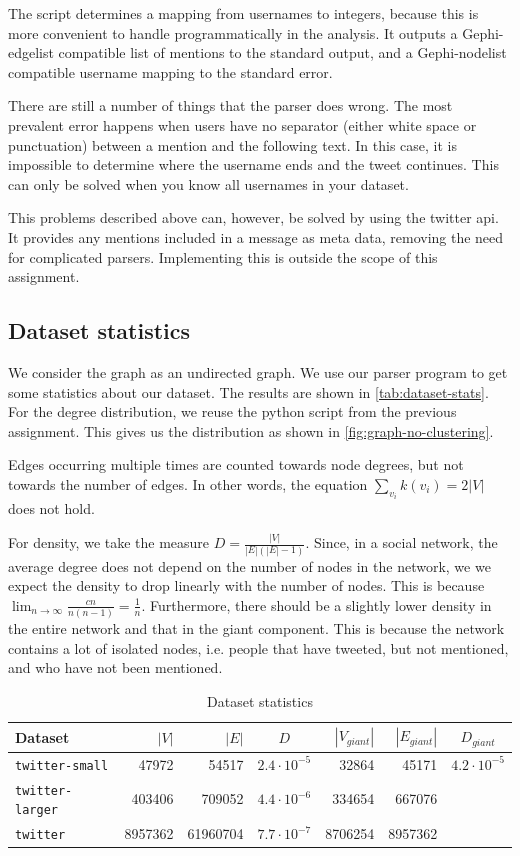 \documentclass[a4paper,10pt,hidelinks]{article}
\begin{document}
The script determines a mapping from usernames to integers, because this is more convenient to handle programmatically in the analysis. It outputs a Gephi-edgelist compatible list of mentions to the standard output, and a Gephi-nodelist compatible username mapping to the standard error.

There are still a number of things that the parser does wrong. The most prevalent error happens when users have no separator (either white space or punctuation) between a mention and the following text. In this case, it is impossible to determine where the username ends and the tweet continues. This can only be solved when you know all usernames in your dataset.

This problems described above can, however, be solved by using the twitter api. It provides any mentions included in a message as meta data, removing the need for complicated parsers. Implementing this is outside the scope of this assignment.

\subsection{Dataset statistics}

We consider the graph as an undirected graph. We use our parser program to get some statistics about our dataset. The results are shown in \autoref{tab:dataset-stats}. For the degree distribution, we reuse the python script from the previous assignment. This gives us the distribution as shown in \autoref{fig:graph-no-clustering}.

Edges occurring multiple times are counted towards node degrees, but not towards the number of edges. In other words, the equation $\sum\limits_{v_i} k(v_i) = 2|V|$ does not hold.

For density, we take the measure $D = \frac{|V|}{|E|(|E| - 1)}$. Since, in a social network, the average degree does not depend on the number of nodes in the network, we we expect the density to drop linearly with the number of nodes. This is because $\lim_{n \rightarrow \infty} \frac{cn}{n (n - 1)} = \frac{1}{n}$. Furthermore, there should be a slightly lower  density in the entire network and that in the giant component. This is because the network contains a lot of isolated nodes, i.e. people that have tweeted, but not mentioned, and who have not been mentioned.

\begin{table}
	\centering
	\begin{tabular}{l || r | r | c | r | r | c}
	Dataset & $|V|$ & $|E|$ & $D$ & $|V_{giant}|$ & $|E_{giant}|$ & $D_{giant}$ \\
	\hline
	\texttt{twitter-small} & 47972 & 54517 & $2.4 \cdot 10^{-5}$ & 32864 & 45171 & $4.2 \cdot 10^{-5}$ \\
	\texttt{twitter-larger} & 403406 & 709052 & $4.4 \cdot 10^{-6}$ & 334654 & 667076 \\
	\texttt{twitter} & 8957362 & 61960704 & $7.7 \cdot  10^{-7}$ & 8706254 & 8957362
	\end{tabular}
	\caption{Dataset statistics}
	\label{tab:dataset-stats}
\end{table}
\end{document}
